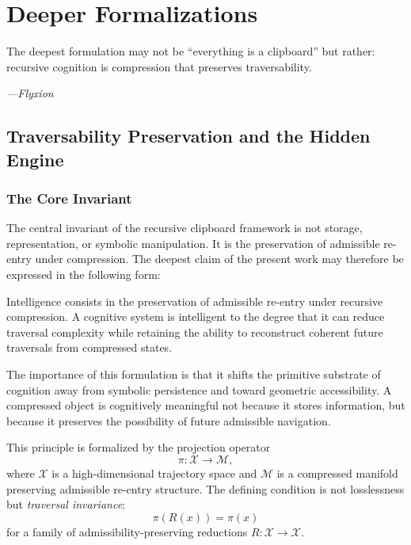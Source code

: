\documentclass[12pt,oneside]{book}
\newcounter{thesisctr}
\newenvironment{thesis}[1][]{%
  \refstepcounter{thesisctr}%
  \begin{tcolorbox}[
    enhanced,
    breakable,
    colback=cliplight,
    colframe=clipblue,
    fonttitle=\bfseries\small,
    title={Thesis~\thethesisctr\ifx&#1&\else~(#1)\fi},
    left=6pt, right=6pt, top=4pt, bottom=4pt,
    arc=2pt
  ]
}{%
  \end{tcolorbox}
}
\theoremstyle{plain}
\theoremstyle{definition}
\theoremstyle{plain}
\newcommand{\cM}{\mathcal{M}}
\newcommand{\cX}{\mathcal{X}}
\begin{document}
\part{Deeper Formalizations}

\epigraph{The deepest formulation may not be ``everything is a clipboard'' but rather: recursive cognition is compression that preserves traversability.}{\textit{---Flyxion}}

\chapter{Traversability Preservation and the Hidden Engine}
\label{ch:traversability}

\section{The Core Invariant}

The central invariant of the recursive clipboard framework is not storage, representation, or symbolic manipulation. It is the preservation of admissible re-entry under compression. The deepest claim of the present work may therefore be expressed in the following form:

\begin{thesis}[Traversability Preservation]
Intelligence consists in the preservation of admissible re-entry under recursive compression. A cognitive system is intelligent to the degree that it can reduce traversal complexity while retaining the ability to reconstruct coherent future traversals from compressed states.
\end{thesis}

The importance of this formulation is that it shifts the primitive substrate of cognition away from symbolic persistence and toward geometric accessibility. A compressed object is cognitively meaningful not because it stores information, but because it preserves the possibility of future admissible navigation.

This principle is formalized by the projection operator
\[
\pi : \cX \to \cM,
\]
where $\cX$ is a high-dimensional trajectory space and $\cM$ is a compressed manifold preserving admissible re-entry structure. The defining condition is not losslessness but \emph{traversal invariance}:
\[
\pi(R(x)) = \pi(x)
\]
for a family of admissibility-preserving reductions $R : \cX \to \cX$.
\end{document}
